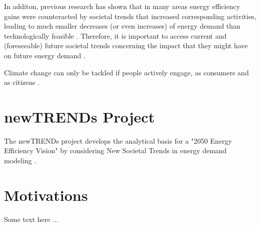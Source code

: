 In additon, 
previous research has shown that 
in many areas energy efficiency gains 
were counteracted by societal trends 
that increased corresponding activities, 
leading to much smaller decreases (or even increases) 
of energy demand 
than technologically feasible \cite{2050}. 
Therefore, 
it is important to 
access current and (foreseeable) future societal trends 
concerning the impact that they might have 
on future energy demand \cite{2050}.

Climate change can only be tackled 
if people actively engage, 
as consumers and as citizens \cite{clean}. 

\section{newTRENDs Project}

The newTRENDs project 
develops the analytical basis 
for a "2050 Energy Efficiency Vision" 
by considering New Societal Trends in energy demand modeling \cite{newtrends}.

\section{Motivations}

Some text here ...

